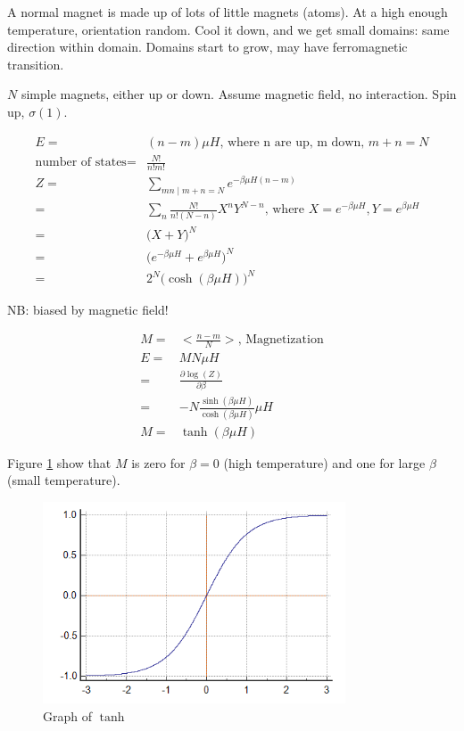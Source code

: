 \documentclass[]{article}
\begin{document}
A normal magnet is made up of lots of little magnets (atoms). At a high enough temperature, orientation random. Cool it down, and we get small domains: same direction within domain. Domains start to grow, may have ferromagnetic transition.

$N$ simple magnets, either up or down. Assume magnetic field, no interaction. Spin up, $\sigma(1).$

\begin{align*}
E=&(n-m)\mu H\text{, where n are up, m down, $m+n=N$}\\
\text{number of states} =&\frac{N!}{n!m!}\\
Z =&\sum_{mn\mid m+n=N} e^{- \beta \mu H(n-m)}\\
=&\sum_{n}\frac{N!}{n!(N-n)}X^nY^{N-n}\text{, where $X=e^{-\beta\mu H},Y=e^{\beta\mu H}$}\\
=&\big(X+Y\big)^N\\
=&\big(e^{-\beta\mu H}+e^{\beta\mu H}\big)^N\\
=&2^N \big(\cosh(\beta\mu H)\big)^N
\end{align*}

NB: biased by magnetic field!

\begin{align*}
	M =& \big< \frac{n-m}{N}\big>\text{, Magnetization} \\
	E =& M N \mu H\\
	=& \frac{\partial \log(Z)}{\partial \beta}\\
	=& - N \frac{\sinh(\beta\mu H)}{\cosh(\beta\mu H)} \mu H\\
	M=& \tanh(\beta\mu H)
\end{align*}

Figure \ref{fig:tanh} show that $M$ is zero for $\beta=0$ (high temperature) and one for large $\beta$ (small temperature).

\begin{figure}[H]
	\caption{Graph of $\tanh$}\label{fig:tanh}
	\includegraphics[width=0.8\textwidth]{tanh}
\end{figure}
\end{document}
